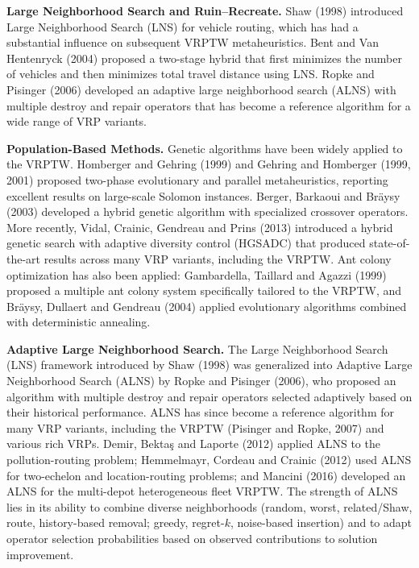 \documentclass[11pt]{article}
\begin{document}
\textbf{Large Neighborhood Search and Ruin--Recreate.} Shaw (1998) introduced Large Neighborhood Search (LNS) for vehicle routing, which has had a substantial influence on subsequent VRPTW metaheuristics. Bent and Van Hentenryck (2004) proposed a two-stage hybrid that first minimizes the number of vehicles and then minimizes total travel distance using LNS. Ropke and Pisinger (2006) developed an adaptive large neighborhood search (ALNS) with multiple destroy and repair operators that has become a reference algorithm for a wide range of VRP variants.

\textbf{Population-Based Methods.} Genetic algorithms have been widely applied to the VRPTW. Homberger and Gehring (1999) and Gehring and Homberger (1999, 2001) proposed two-phase evolutionary and parallel metaheuristics, reporting excellent results on large-scale Solomon instances. Berger, Barkaoui and Br\"aysy (2003) developed a hybrid genetic algorithm with specialized crossover operators. More recently, Vidal, Crainic, Gendreau and Prins (2013) introduced a hybrid genetic search with adaptive diversity control (HGSADC) that produced state-of-the-art results across many VRP variants, including the VRPTW. Ant colony optimization has also been applied: Gambardella, Taillard and Agazzi (1999) proposed a multiple ant colony system specifically tailored to the VRPTW, and Br\"aysy, Dullaert and Gendreau (2004) applied evolutionary algorithms combined with deterministic annealing.

\textbf{Adaptive Large Neighborhood Search.} The Large Neighborhood Search (LNS) framework introduced by Shaw (1998) was generalized into Adaptive Large Neighborhood Search (ALNS) by Ropke and Pisinger (2006), who proposed an algorithm with multiple destroy and repair operators selected adaptively based on their historical performance. ALNS has since become a reference algorithm for many VRP variants, including the VRPTW (Pisinger and Ropke, 2007) and various rich VRPs. Demir, Bekta\c{s} and Laporte (2012) applied ALNS to the pollution-routing problem; Hemmelmayr, Cordeau and Crainic (2012) used ALNS for two-echelon and location-routing problems; and Mancini (2016) developed an ALNS for the multi-depot heterogeneous fleet VRPTW. The strength of ALNS lies in its ability to combine diverse neighborhoods (random, worst, related/Shaw, route, history-based removal; greedy, regret-$k$, noise-based insertion) and to adapt operator selection probabilities based on observed contributions to solution improvement.
\end{document}
